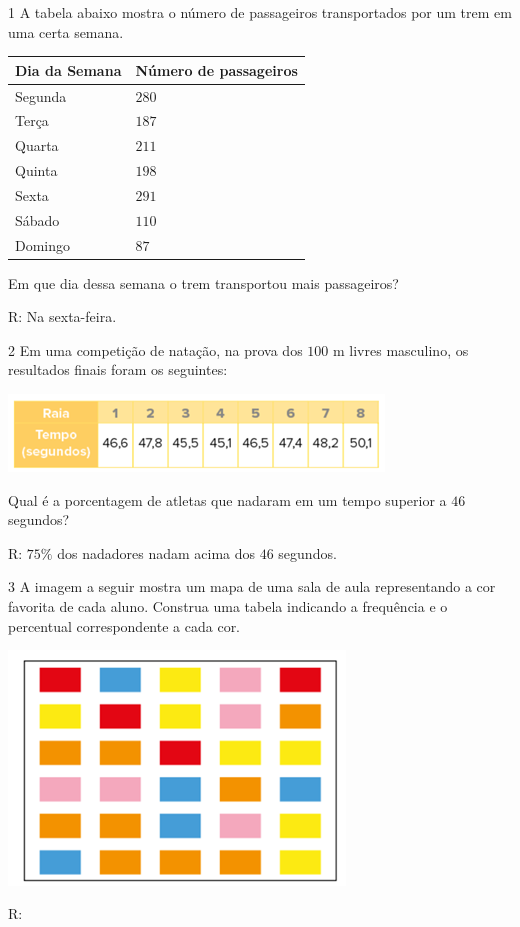 \num{1}  A tabela abaixo mostra o número de passageiros transportados por um
trem em uma certa semana.


\begin{longtable}[]{@{}ll@{}}
\toprule
Dia da Semana & Número de passageiros\tabularnewline
\midrule
\endhead
Segunda & $280$\tabularnewline
Terça & $187$\tabularnewline
Quarta & $211$\tabularnewline
Quinta & $198$\tabularnewline
Sexta & $291$\tabularnewline
Sábado & $110$\tabularnewline
Domingo & $87$\tabularnewline
\bottomrule
\end{longtable}

Em que dia dessa semana o trem transportou mais passageiros?

R: Na sexta-feira.

\num{2}  Em uma competição de natação, na prova dos $100$ m livres masculino, os
resultados finais foram os seguintes:

\includegraphics[width=3.92708in,height=0.8125in]{./imgSAEB_6_MAT/media/image81.png}

Qual é a porcentagem de atletas que nadaram em um tempo superior a $46$
segundos?

R: $75\%$ dos nadadores nadam acima dos $46$ segundos.

\num{3}  A imagem a seguir mostra um mapa de uma sala de aula representando a
cor favorita de cada aluno. Construa uma tabela indicando a frequência e
o percentual correspondente a cada cor.

\includegraphics[width=3.52292in,height=2.45347in]{./imgSAEB_6_MAT/media/image82.png}

R:

